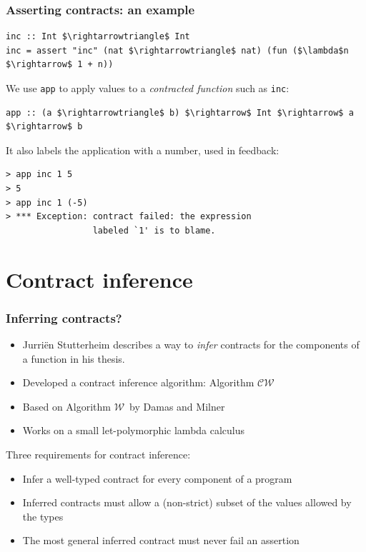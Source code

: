 \documentclass[]{beamer}
\newcommand{\W}{$\mathcal{W}$}
\newcommand{\CW}{$\mathcal{CW}$}
\begin{document}
\begin{frame}[fragile]
\frametitle{Asserting contracts: an example}

\begin{lstlisting}[mathescape]
inc :: Int $\rightarrowtriangle$ Int
inc = assert "inc" (nat $\rightarrowtriangle$ nat) (fun ($\lambda$n $\rightarrow$ 1 + n))
\end{lstlisting}

We use \texttt{app} to apply values to a \emph{contracted function} such as \texttt{inc}:

\begin{lstlisting}[mathescape]
app :: (a $\rightarrowtriangle$ b) $\rightarrow$ Int $\rightarrow$ a $\rightarrow$ b
\end{lstlisting}

It also labels the application with a number, used in feedback:
\begin{verbatim}
> app inc 1 5
> 5
> app inc 1 (-5)
> *** Exception: contract failed: the expression 
                 labeled `1' is to blame.
\end{verbatim}

\end{frame}

\section{Contract inference}

\begin{frame}[fragile]
\frametitle{Inferring contracts?}

\begin{itemize}
	\item Jurri\"en Stutterheim describes a way to \emph{infer} contracts for the components of a function in his thesis.
	\item Developed a contract inference algorithm: Algorithm \CW
	\item Based on Algorithm \W ~by Damas and Milner
	\item Works on a small let-polymorphic lambda calculus
\end{itemize}

Three requirements for contract inference:

\begin{itemize}
	\item Infer a well-typed contract for every component of a program
	\item Inferred contracts must allow a (non-strict) subset of the values allowed by the types
	\item The most general inferred contract must never fail an assertion
\end{itemize}

\end{frame}
\end{document}
